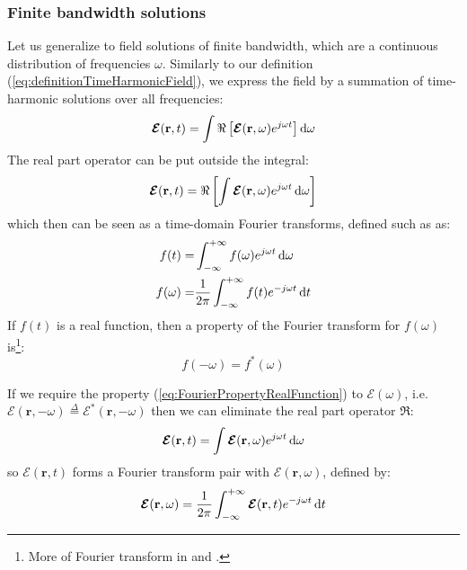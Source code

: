 \subsubsection{Finite bandwidth solutions}
Let us generalize to field solutions of finite bandwidth, which are a continuous distribution of frequencies $\omega$. Similarly to our definition  (\ref{eq:definitionTimeHarmonicField}), we express the field by a summation of time-harmonic solutions over all frequencies:
\begin{equation}
\boldsymbol{\mathcal{E}}(\mathbf{r}, t)
=
\int
\Re \left[
\boldsymbol{\mathcal{E}}(\mathbf{r}, \omega)
e^{j\omega t}
\right] 
\mathop{}\!\mathrm{d} \omega
\end{equation}
The real part operator can be put outside the integral:
\begin{equation}
\boldsymbol{\mathcal{E}}(\mathbf{r}, t)
=
\Re \left[
\int
\boldsymbol{\mathcal{E}}(\mathbf{r}, \omega)
e^{j\omega t}
\mathop{}\!\mathrm{d} \omega
\right] 
\end{equation}
which then can be seen as a time-domain Fourier transforms, defined such as as:
\begin{subequations}
	\begin{align}
		f(t) =& \int_{-\infty}^{+\infty} f(\omega) e^{j\omega t} \mathop{}\!\mathrm{d} \omega \\
	f(\omega) =& \frac{1}{2\pi}\int_{-\infty}^{+\infty} f(t) e^{-j\omega t} \mathop{}\!\mathrm{d} t 
	\end{align}
	\label{eq:FourierTransformTime}
\end{subequations}
If $f(t)$ is a real function, then a property of the Fourier transform for $f(\omega)$ is\footnote{More of Fourier transform in \parencite[sec.1.3]{Clemmow1996} and \parencite[chap.4]{Harrington2001}.}:
\begin{equation}
f(-\omega) = f^*(\omega)
\label{eq:FourierPropertyRealFunction}
\end{equation}


If we require the property  (\ref{eq:FourierPropertyRealFunction}) to $\boldsymbol{\mathcal{E}}(\omega)$, i.e. $
\boldsymbol{\mathcal{E}}(\mathbf{r}, -\omega)
\overset{\Delta}{=}
\boldsymbol{\mathcal{E}}^*(\mathbf{r}, -\omega)
$
then we can eliminate the real part operator $\Re$:
\begin{equation}
\boldsymbol{\mathcal{E}}(\mathbf{r}, t)
=
\int
\boldsymbol{\mathcal{E}}(\mathbf{r}, \omega)
e^{j\omega t}
\mathop{}\!\mathrm{d} \omega
\end{equation}
so $\boldsymbol{\mathcal{E}}(\mathbf{r}, t)$ forms a Fourier transform pair with $\boldsymbol{\mathcal{E}}(\mathbf{r}, \omega)$,  defined by:
\begin{equation}
	\boldsymbol{\mathcal{E}}(\mathbf{r}, \omega) = \frac{1}{2\pi}\int_{-\infty}^{+\infty} 
	\boldsymbol{\mathcal{E}}(\mathbf{r}, t)
	 e^{-j\omega t} \mathop{}\!\mathrm{d} t 
	 \label{eq:TimeFourierTransformE}
\end{equation}

